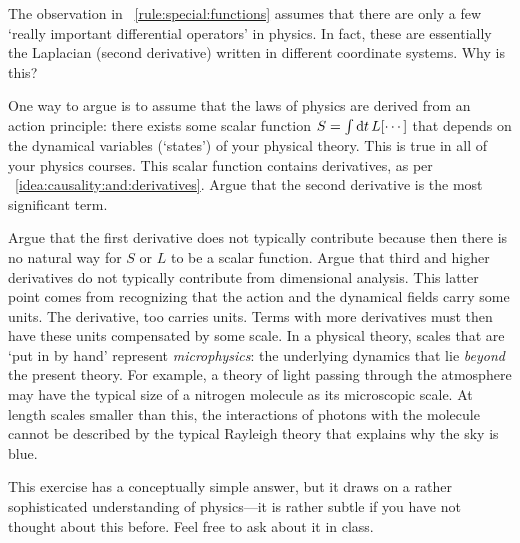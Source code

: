 \begin{exercise}\label{ex:few:differential:ops}
The observation in \bigidearef{}~\ref{rule:special:functions} assumes that there are only a few `really important differential operators' in physics. In fact, these are essentially the Laplacian (second derivative) written in different coordinate systems. Why is this? 

One way to argue is to assume that the laws of physics are derived from an action principle: there exists some scalar function  $S=\int \operatorname{d}\mkern-3mu^{}\mkern-1mu{t}\, L[\cdots]$ that depends on the dynamical variables (`states') of your physical theory. This is true in all of your physics courses.  This scalar function contains derivatives, as per \bigidearef{}~\ref{idea:causality:and:derivatives}. Argue that the second derivative is the most significant term.

Argue that the first derivative does not typically contribute because then there is no natural way for $S$ or $L$ to be a scalar function. Argue that third and higher derivatives do not typically contribute from dimensional analysis. This latter point comes from recognizing that the action and the dynamical fields carry some units. The derivative, too carries units. Terms with more derivatives must then have these units compensated by some scale. In a physical theory, scales that are `put in by hand' represent \emph{microphysics}: the underlying dynamics that lie \emph{beyond} the present theory. For example, a theory of light passing through the atmosphere may have the typical size of a nitrogen molecule as its microscopic scale. At length scales smaller than this, the interactions of photons with the molecule cannot be described by the typical Rayleigh theory that explains why the sky is blue.

This exercise has a conceptually simple answer, but it draws on a rather sophisticated understanding of physics---it is rather subtle if you have not thought about this before. Feel free to ask about it in class. 
\end{exercise}








